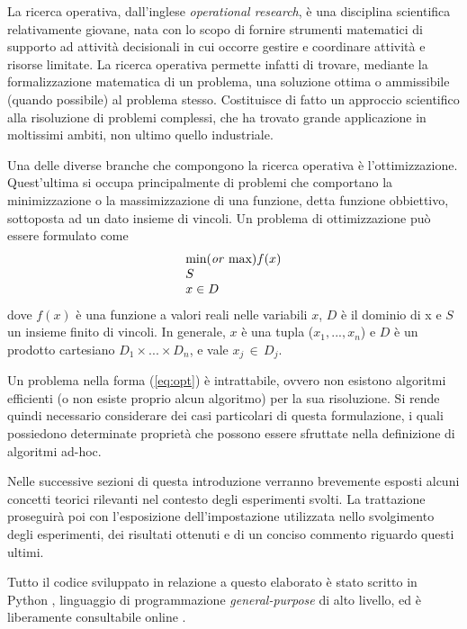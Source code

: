 La ricerca operativa, dall'inglese \textit{operational research}, è una disciplina scientifica relativamente 
giovane, nata con lo scopo di fornire strumenti matematici di supporto ad attività decisionali in cui occorre gestire e coordinare 
attività e risorse limitate. La ricerca operativa permette infatti di trovare, mediante la formalizzazione 
matematica di un problema, una soluzione ottima o ammissibile (quando possibile) al problema stesso. 
Costituisce di fatto un approccio scientifico alla risoluzione di problemi 
complessi, che ha trovato grande applicazione in moltissimi ambiti, non ultimo quello industriale. 

Una delle diverse branche che compongono la ricerca operativa è l'ottimizzazione. 
Quest'ultima si occupa principalmente di problemi che comportano la minimizzazione o la massimizzazione di una funzione, detta funzione
obbiettivo, sottoposta ad un dato insieme di vincoli. 
Un problema di ottimizzazione può essere formulato come 
\begin{align}
	\label{eq:opt}
	\begin{array}{l}
      \text{min(\textit{or} max)}f(x)\\
      S	\\
      x \in D
    \end{array}
\end{align}
dove $f(x)$ è una funzione a valori reali nelle variabili $x$, $D$ è il dominio di x e $S$ un insieme finito di vincoli. In generale,  
$x$ è una tupla ($x_1,...,x_n$) e $D$ è un prodotto cartesiano $D_1 \times ... \times D_n$, e vale $x_j \, \in \, D_j$. 

Un problema nella forma (\ref{eq:opt}) è intrattabile, ovvero non esistono algoritmi efficienti (o non esiste proprio
alcun algoritmo) per la sua risoluzione. Si rende quindi necessario considerare dei casi particolari di questa formulazione, i quali 
possiedono determinate proprietà che possono essere sfruttate nella definizione di algoritmi ad-hoc.
\newpage

Nelle successive sezioni di questa introduzione verranno brevemente esposti alcuni concetti teorici rilevanti nel contesto degli 
esperimenti svolti. La trattazione proseguirà poi con l'esposizione dell'impostazione utilizzata nello svolgimento degli
esperimenti, dei risultati ottenuti e di un conciso commento riguardo questi ultimi. 

\noindent
Tutto il codice sviluppato in relazione a questo elaborato è stato scritto in Python \cite{python}, linguaggio di programmazione \textit{general-purpose} di alto livello,  ed è liberamente consultabile online \cite{repository}.